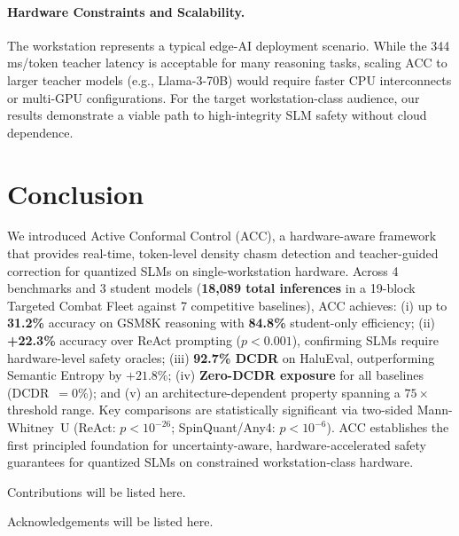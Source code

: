 \documentclass{uai2026}  %
\begin{document}
\paragraph{Hardware Constraints and Scalability.}
The workstation represents a typical edge-AI deployment scenario.
While the 344\,ms/token teacher latency is acceptable for many reasoning
tasks, scaling ACC to larger teacher models (e.g., Llama-3-70B)
would require faster CPU interconnects or multi-GPU configurations.
For the target workstation-class audience, our results demonstrate a
viable path to high-integrity SLM safety without cloud dependence.

\section{Conclusion}
\enlargethispage{2\baselineskip}
\label{sec:conclusion}

We introduced Active Conformal Control (ACC), a hardware-aware framework
that provides real-time, token-level density chasm detection and
teacher-guided correction for quantized SLMs on single-workstation hardware.
Across 4 benchmarks and 3 student models (\textbf{18,089 total inferences}
in a 19-block Targeted Combat Fleet against 7 competitive baselines),
ACC achieves: (i) up to \textbf{31.2\%} accuracy on GSM8K reasoning with \textbf{84.8\%} student-only efficiency; (ii) \textbf{+22.3\%} accuracy over ReAct prompting ($p < 0.001$), confirming SLMs require hardware-level safety oracles; (iii) \textbf{92.7\% DCDR} on HaluEval, outperforming Semantic Entropy by $+21.8\%$; (iv) \textbf{Zero-DCDR exposure} for all baselines (DCDR~$=0\%$); and (v) an architecture-dependent property spanning a $75\times$ threshold range.
Key comparisons are statistically significant via two-sided Mann-Whitney~U
(ReAct: $p<10^{-26}$; SpinQuant/Any4: $p<10^{-6}$).
ACC establishes the first principled foundation for uncertainty-aware,
hardware-accelerated safety guarantees for quantized SLMs on
constrained workstation-class hardware.

\begin{contributions}
  Contributions will be listed here.
\end{contributions}

\begin{acknowledgements}
  Acknowledgements will be listed here.
\end{acknowledgements}
\end{document}
